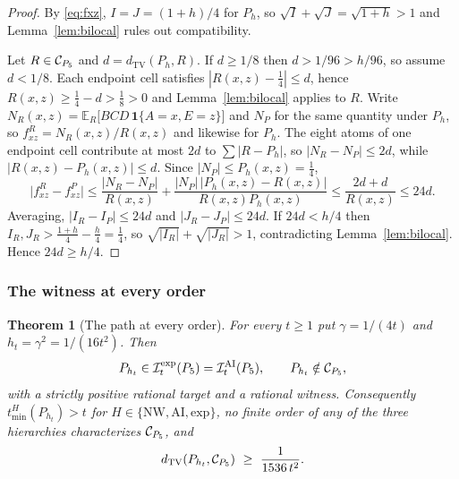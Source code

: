 \documentclass[11pt]{article}
\theoremstyle{plain}
\newtheorem{theorem}{Theorem}[section]
\theoremstyle{definition}
\DeclareMathOperator{\TV}{TV}
\newcommand{\IAI}{\mathcal I^{\mathrm{AI}}}
\newcommand{\Iexp}{\mathcal I^{\mathrm{exp}}}
\newcommand{\E}{\mathbb E}
\newcommand{\one}{\mathbf 1}
\newcommand{\tmin}{t_{\min}}
\begin{document}
\begin{proof}
By \eqref{eq:fxz}, $I=J=(1+h)/4$ for $P_h$, so $\sqrt I+\sqrt J=\sqrt{1+h}>1$ and Lemma~\ref{lem:bilocal} rules out compatibility.

Let $R\in\mathcal C_{P_5}$ and $d=d_{\TV}(P_h,R)$. If $d\ge1/8$ then $d>1/96>h/96$, so assume $d<1/8$. Each endpoint cell satisfies $|R(x,z)-\tfrac14|\le d$, hence $R(x,z)\ge\tfrac14-d>\tfrac18>0$ and Lemma~\ref{lem:bilocal} applies to $R$. Write $N_R(x,z)=\E_R\bigl[BCD\,\one\{A=x,E=z\}\bigr]$ and $N_P$ for the same quantity under $P_h$, so $f^R_{xz}=N_R(x,z)/R(x,z)$ and likewise for $P_h$. The eight atoms of one endpoint cell contribute at most $2d$ to $\sum|R-P_h|$, so $|N_R-N_P|\le2d$, while $|R(x,z)-P_h(x,z)|\le d$. Since $|N_P|\le P_h(x,z)=\tfrac14$,
\[
\bigl|f^R_{xz}-f^P_{xz}\bigr|
\le\frac{|N_R-N_P|}{R(x,z)}+\frac{|N_P|\,\bigl|P_h(x,z)-R(x,z)\bigr|}{R(x,z)P_h(x,z)}
\le\frac{2d+d}{R(x,z)}\le24d .
\]
Averaging, $|I_R-I_P|\le24d$ and $|J_R-J_P|\le24d$. If $24d<h/4$ then
$I_R,J_R>\tfrac{1+h}4-\tfrac h4=\tfrac14$, so $\sqrt{|I_R|}+\sqrt{|J_R|}>1$, contradicting Lemma~\ref{lem:bilocal}. Hence $24d\ge h/4$.
\end{proof}

\subsubsection{The witness at every order}\label{sec:pathwitness}

\begin{theorem}[The path at every order]\label{thm:fivepath}
For every $t\ge1$ put $\gamma=1/(4t)$ and $h_t=\gamma^2=1/(16t^2)$. Then
\[
P_{h_t}\in\Iexp_t(P_5)=\IAI_t(P_5),\qquad P_{h_t}\notin\Cpath ,
\]
with a strictly positive rational target and a rational witness. Consequently $\tmin^H(P_{h_t})>t$ for $H\in\{\mathrm{NW},\mathrm{AI},\mathrm{exp}\}$, no finite order of any of the three hierarchies characterizes $\mathcal C_{P_5}$, and
\[
d_{\TV}(P_{h_t},\Cpath)\ \ge\ \frac1{1536\,t^2}.
\]
\end{theorem}
\end{document}
